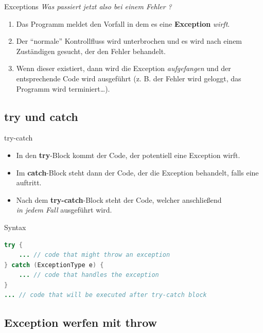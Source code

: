 \documentclass[18pt]{beamer}
\newcommand{\quotes}[1]{``#1''}
\begin{document}
\begin{frame}{Exceptions}
    \textit{Was passiert jetzt also bei einem Fehler ?}
    \vspace{.2in}
    \begin{enumerate}
        \item Das Programm meldet den Vorfall in dem es eine \textbf{Exception} \textit{wirft}.
        \item Der \quotes{normale} Kontrollfluss wird unterbrochen und es wird nach einem Zuständigen gesucht, der den Fehler behandelt.
        \item Wenn dieser existiert, dann wird die Exception \textit{aufgefangen} und der entsprechende Code wird ausgeführt (z. B. der Fehler wird geloggt, das Programm wird terminiert\dots).
    \end{enumerate}
\end{frame}


\subsection{try und catch}


\begin{frame}[fragile]{try-catch}
    \begin{itemize}
        \item In den \textbf{try}-Block kommt der Code, der potentiell eine Exception wirft.
        \item Im \textbf{catch}-Block steht dann der Code, der die Exception behandelt, falls eine auftritt.
        \item Nach dem \textbf{try-catch}-Block steht der Code, welcher anschließend \\
        \textit{in jedem Fall} ausgeführt wird.
    \end{itemize}

    \begin{exampleblock}{Syntax}
        \begin{lstlisting}[language=Java,basicstyle=\scriptsize]
try {
    ... // code that might throw an exception
} catch (ExceptionType e) {
    ... // code that handles the exception
}
... // code that will be executed after try-catch block
        \end{lstlisting}

    \end{exampleblock}
\end{frame}

\subsection{Exception werfen mit throw}
\end{document}
